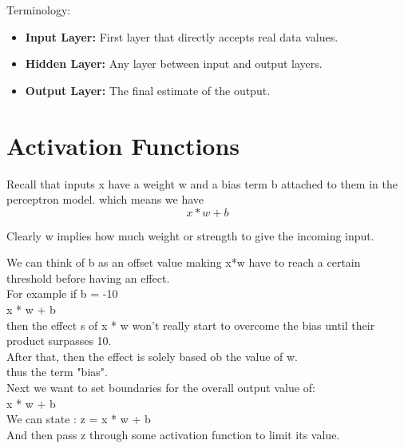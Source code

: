 \documentclass[12pt]{article}
\begin{document}
\Large Terminology:\small
\begin{itemize}
	\item
	\textbf{Input Layer:} First layer that directly accepts real data values.
	\item
	\textbf{Hidden Layer:} Any layer between input and output layers.
	\item
	\textbf{Output Layer:} The final estimate of the output.
\end{itemize}


\section{Activation Functions}

Recall that inputs x have a weight w and a bias term b attached to them in the perceptron model.
which means we have 
\begin{equation}
	x*w+b
\end{equation}

Clearly w implies how much weight or strength to give the incoming input.

We can think of b as an offset value making x*w have to reach a certain threshold before having an effect.\\

For example if b = -10 \\
x * w + b\\
then the effect s of x * w won't really start to overcome the bias until their product surpasses 10.\\
After that, then the effect is solely based ob the value of w.\\
thus the term "bias".\\

 Next we want to set boundaries for the overall output value of:
\\
x * w + b \\
We can state :
z = x * w + b \\
And then pass z through some activation function to limit its value.\\
\end{document}
